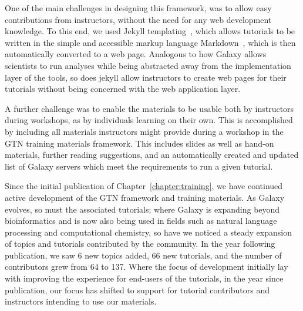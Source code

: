 One of the main challenges in designing this framework, was to allow easy contributions from instructors, without the need for any web development knowledge. To this end, we used Jekyll templating~\cite{jekyll}, which allows tutorials to be written in the simple and accessible markup language Markdown~\cite{markdown}, which is then automatically converted to a web page. Analogous to how Galaxy allows scientists to run analyses while being abstracted away from the implementation layer of the tools, so does jekyll allow instructors to create web pages for their tutorials without being concerned with the web application layer.

A further challenge was to enable the materials to be usable both by instructors during workshops, as by individuals learning on their own. This is accomplished by including all materials instructors might provide during a workshop in the GTN training materials framework. This includes slides as well as hand-on materials, further reading suggestions, and an automatically created and updated list of Galaxy servers which meet the requirements to run a given tutorial.

\begin{comment}
<closer integration with galaxy servers>

<feedback, planemo, cofests, dashboard, instructor topic, levels, translations, tess search, curricula, toc>

2019: 4 new topics (metabolomics, computational chemistry, data manipulation, ui and features), 66 new tutorials
\end{comment}

Since the initial publication of Chapter~\ref{chapter:training}, we have continued active development of the GTN framework and training materials. As Galaxy evolves, so must the associated tutorials; where Galaxy is expanding beyond bioinformatics and is now also being used in fields such as natural language processing and computational chemistry, so have we noticed a steady expansion of topics and tutorials contributed by the community. In the year following publication, we saw 6 new topics added, 66 new tutorials, and the number of contributors grew from 64 to 137. Where the focus of development initially lay with improving the experience for end-users of the tutorials, in the year since publication, our focus has shifted to support for tutorial contributors and instructors intending to use our materials.

